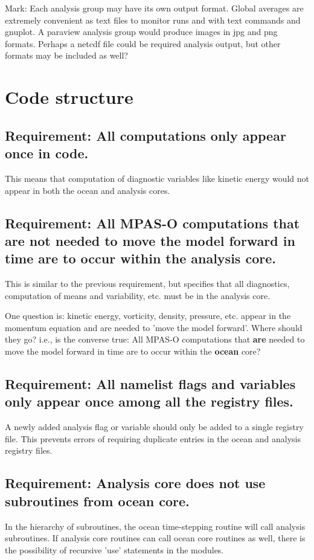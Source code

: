 \documentclass[11pt]{report}
\begin{document}
Mark: Each analysis group may have its own output format.  
Global averages are extremely convenient as text files to monitor runs and with text commands and gnuplot.  A paraview analysis group would produce images in jpg and png formats.  Perhaps a netcdf file could be required analysis output, but other formats may be included as well?

\newpage
\section{Code structure}
\subsection{{\color{green} Requirement:} All computations only appear once in code.}
This means that computation of diagnostic variables like kinetic energy would not appear in both the ocean and analysis cores.

\subsection{{\color{red} Requirement:} All MPAS-O computations that are not needed to move the model forward in time are to occur within the analysis core.}
This is similar to the previous requirement, but specifies that all diagnostics, computation of means and variability, etc. must be in the analysis core.  

One question is: kinetic energy, vorticity, density, pressure, etc. appear in the momentum equation and are needed to 'move the model forward'.  Where should they go?  i.e., is the converse true: All MPAS-O computations that {\bf are} needed to move the model forward in time are to occur within the {\bf ocean} core?

\subsection{{\color{green} Requirement:} All namelist flags and variables only appear once among all the registry files.}
A newly added analysis flag or variable should only be added to a single registry file.  This prevents errors of requiring duplicate entries in the ocean and analysis registry files.

\subsection{{\color{red} Requirement:} Analysis core does not use subroutines from ocean core.}
In the hierarchy of subroutines, the ocean time-stepping routine will call analysis subroutines.  If analysis core routines can call ocean core routines as well, there is the possibility of recursive 'use' statements in the modules.
\end{document}
